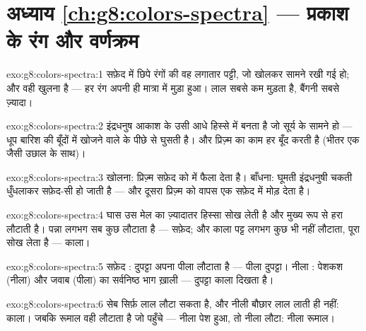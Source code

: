 \section*{अध्याय \ref{ch:g8:colors-spectra} --- प्रकाश के रंग और वर्णक्रम}

\begin{solution}{exo:g8:colors-spectra:1}
सफ़ेद  में छिपे रंगों की वह लगातार पट्टी, जो खोलकर सामने रखी गई
हो; और  वही खुलना है --- हर रंग अपनी ही मात्रा में मुड़ा हुआ।
लाल सबसे कम मुड़ता है, बैंगनी सबसे ज़्यादा।
\end{solution}

\begin{solution}{exo:g8:colors-spectra:2}
इंद्रधनुष आकाश के उसी आधे हिस्से में बनता है जो सूर्य के सामने हो ---
धूप बारिश की बूँदों में खोजने वाले के पीछे से घुसती है। और प्रिज़्म का
काम हर बूँद करती है (भीतर एक  जैसी उछाल के साथ)।
\end{solution}

\begin{solution}{exo:g8:colors-spectra:3}
खोलना: प्रिज़्म सफ़ेद  को  में फैला देता है। बाँधना:
घूमती इंद्रधनुषी चकती धुँधलाकर सफ़ेद-सी हो जाती है --- और दूसरा
प्रिज़्म  को वापस एक सफ़ेद  में मोड़ देता है।
\end{solution}

\begin{solution}{exo:g8:colors-spectra:4}
घास उस मेल का ज़्यादातर हिस्सा सोख लेती है और मुख्य रूप से हरा लौटाती
है। पन्ना लगभग सब कुछ लौटाता है --- सफ़ेद; और काला पट्ट लगभग कुछ भी
नहीं लौटाता, पूरा सोख लेता है --- काला।
\end{solution}

\begin{solution}{exo:g8:colors-spectra:5}
सफ़ेद : दुपट्टा अपना पीला लौटाता है --- पीला दुपट्टा। नीला
: पेशकश (नीला) और जवाब (पीला) का सर्वनिष्ठ भाग ख़ाली --- दुपट्टा
काला दिखता है।
\end{solution}

\begin{solution}{exo:g8:colors-spectra:6}
सेब सिर्फ़ लाल लौटा सकता है, और नीली बौछार लाल लाती ही नहीं: काला।
जबकि रूमाल वही लौटाता है जो पहुँचे --- नीला पेश हुआ, तो नीला लौटा:
नीला रूमाल।
\end{solution}

